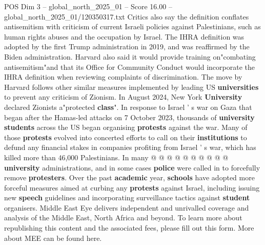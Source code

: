 \begin{textsample}{POS Dim 3 – global\_north\_2025\_01 – Score 16.00 – global\_north\_2025\_01/120350317.txt}
Critics also say the definition conflates antisemitism with criticism of current Israeli policies against Palestinians, such as human rights abuses and the occupation by Israel.
The IHRA definition was adopted by the first Trump administration in 2019, and was reaffirmed by the Biden administration.
Harvard also said it would provide training on"combating antisemitism"and that its Office for Community Conduct would incorporate the IHRA definition when reviewing complaints of discrimination.
The move by Harvard follows other similar measures implemented by leading US \textbf{universities} to prevent any criticism of Zionism.
In August 2024, New York \textbf{University} declared Zionists a"protected \textbf{class}".
In response to Israel ' s war on Gaza that began after the Hamas-led attacks on 7 October 2023, thousands of \textbf{university} \textbf{students} across the US began organising \textbf{protests} against the war.
Many of those \textbf{protests} evolved into concerted efforts to call on their \textbf{institutions} to defund any financial stakes in companies profiting from Israel ' s war, which has killed more than 46,000 Palestinians.
In many @ @ @ @ @ @ @ @ @ @ \textbf{university} administrations, and in some cases \textbf{police} were called in to forcefully remove \textbf{protesters}.
Over the past \textbf{academic} year, \textbf{schools} have adopted more forceful measures aimed at curbing any \textbf{protests} against Israel, including issuing new \textbf{speech} guidelines and incorporating surveillance tactics against \textbf{student} organisers.
Middle East Eye delivers independent and unrivalled coverage and analysis of the Middle East, North Africa and beyond.
To learn more about republishing this content and the associated fees, please fill out this form.
More about MEE can be found here.

\end{textsample}
